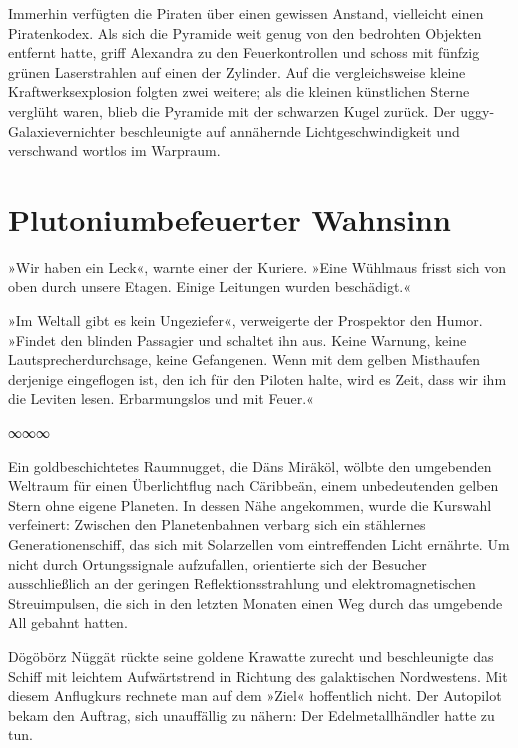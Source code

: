Immerhin verfügten die Piraten über einen gewissen Anstand, vielleicht einen Piratenkodex. Als sich die Pyramide weit genug von den bedrohten Objekten entfernt hatte, griff Alexandra zu den Feuerkontrollen und schoss mit fünfzig grünen Laserstrahlen auf einen der Zylinder. Auf die vergleichsweise kleine Kraftwerksexplosion folgten zwei weitere; als die kleinen künstlichen Sterne verglüht waren, blieb die Pyramide mit der schwarzen Kugel zurück. Der uggy-Galaxievernichter beschleunigte auf annähernde Lichtgeschwindigkeit und verschwand wortlos im Warpraum.


\chapter{Plutoniumbefeuerter Wahnsinn}

»Wir haben ein Leck«, warnte einer der Kuriere. »Eine Wühlmaus frisst sich von oben durch unsere Etagen. Einige Leitungen wurden beschädigt.«

»Im Weltall gibt es kein Ungeziefer«, verweigerte der Prospektor den Humor. »Findet den blinden Passagier und schaltet ihn aus. Keine Warnung, keine Lautsprecherdurchsage, keine Gefangenen. Wenn mit dem gelben Misthaufen derjenige eingeflogen ist, den ich für den Piloten halte, wird es Zeit, dass wir ihm die Leviten lesen. Erbarmungslos und mit Feuer.«

\begin{center}
	∞∞∞
\end{center}

Ein goldbeschichtetes Raumnugget, die Däns Miräköl, wölbte den umgebenden Weltraum für einen Überlichtflug nach Cäribbeän, einem unbedeutenden gelben Stern ohne eigene Planeten. In dessen Nähe angekommen, wurde die Kurswahl verfeinert: Zwischen den Planetenbahnen verbarg sich ein stählernes Generationenschiff, das sich mit Solarzellen vom eintreffenden Licht ernährte. Um nicht durch Ortungssignale aufzufallen, orientierte sich der Besucher ausschließlich an der geringen Reflektionsstrahlung und elektromagnetischen Streuimpulsen, die sich in den letzten Monaten einen Weg durch das umgebende All gebahnt hatten.


Dögöbörz Nüggät rückte seine goldene Krawatte zurecht und beschleunigte das Schiff mit leichtem Aufwärtstrend in Richtung des galaktischen Nordwestens. Mit diesem Anflugkurs rechnete man auf dem »Ziel« hoffentlich nicht. Der Autopilot bekam den Auftrag, sich unauffällig zu nähern: Der Edelmetallhändler hatte zu tun.

